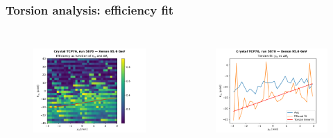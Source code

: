 \documentclass[10pt]{beamer}
\begin{document}
\begin{frame}
\frametitle{Torsion analysis: efficiency fit}
\vspace{-0.75cm}
\begin{columns}[t] %

\begin{figure}
\includegraphics[width=\linewidth]{efficiency_histo.pdf}\\
\end{figure}

\begin{figure}
\includegraphics[width=\linewidth]{torsion_fit.pdf}\\
\end{figure}


\end{columns}
\end{frame}
\end{document}
